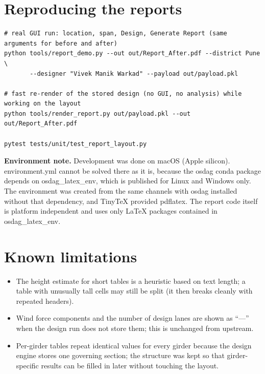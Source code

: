 \documentclass[10pt,a4paper]{article}
\newcommand{\file}[1]{{\footnotesize\ttfamily #1}}
\newcommand{\code}[1]{{\small\ttfamily #1}}
\newenvironment{codeblock}{\par\small\begingroup}{\endgroup\par}
\begin{document}
\section{Reproducing the reports}

\begin{codeblock}
\begin{verbatim}
# real GUI run: location, span, Design, Generate Report (same arguments for before and after)
python tools/report_demo.py --out out/Report_After.pdf --district Pune \
       --designer "Vivek Manik Warkad" --payload out/payload.pkl

# fast re-render of the stored design (no GUI, no analysis) while working on the layout
python tools/render_report.py out/payload.pkl --out out/Report_After.pdf

pytest tests/unit/test_report_layout.py
\end{verbatim}
\end{codeblock}

\textbf{Environment note.} Development was done on macOS (Apple silicon). \file{environment.yml} cannot be solved there as it is, because the \code{osdag} conda package depends on \code{osdag\_latex\_env}, which is published for Linux and Windows only. The environment was created from the same channels with \code{osdag} installed without that dependency, and TinyTeX provided \code{pdflatex}. The report code itself is platform independent and uses only LaTeX packages contained in \code{osdag\_latex\_env}.

\section{Known limitations}

\begin{itemize}
\item The height estimate for short tables is a heuristic based on text length; a table with unusually tall cells may still be split (it then breaks cleanly with repeated headers).
\item Wind force components and the number of design lanes are shown as ``---'' when the design run does not store them; this is unchanged from upstream.
\item Per-girder tables repeat identical values for every girder because the design engine stores one governing section; the structure was kept so that girder-specific results can be filled in later without touching the layout.
\end{itemize}
\end{document}
